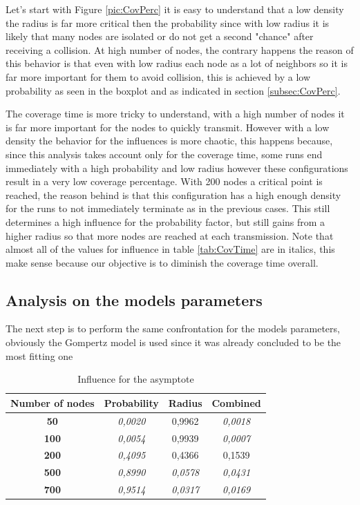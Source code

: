 Let's start with Figure \ref{pic:CovPerc} it is easy to understand that a low density the radius is far more critical then the probability since with low radius it is likely that many nodes are isolated or do not get a second "chance" after receiving a collision. At high number of nodes, the contrary happens the reason of this behavior is that even with low radius each node as a lot of neighbors so it is far more important for them to avoid collision, this is achieved by a low probability as seen in the boxplot and as indicated in section \ref{subsec:CovPerc}.

The coverage time is more tricky to understand, with a high number of nodes it is far more important for the nodes to quickly transmit. However with a low density the behavior for the influences is more chaotic, this happens because, since this analysis takes account only for the coverage time, some runs end immediately with a high probability and low radius however these configurations result in a very low coverage percentage. With 200 nodes a critical point is reached, the reason behind is that this configuration has a high enough density for the runs to not immediately terminate as in the previous cases. This still determines a high influence for the probability factor, but still gains from a higher radius so that more nodes are reached at each transmission. Note that almost all of the values for influence in table \ref{tab:CovTime} are in italics, this make sense because our objective is to diminish the coverage time overall.

\subsection{Analysis on the models parameters}
The next step is to perform the same confrontation for the models parameters, obviously the Gompertz model is used since it was already concluded to be the most fitting one

\begin{table}[H]
\centering
\begin{tabular}{|c|c|c|c|}
\hline
\textbf{Number of   nodes} & \textbf{Probability} & \textbf{Radius} & \textbf{Combined} \\ \hline
\textbf{50} & \textit{0,0020} & 0,9962 & \textit{0,0018} \\ \hline
\textbf{100} & \textit{0,0054} & 0,9939 & \textit{0,0007} \\ \hline
\textbf{200} & \textit{0,4095} & 0,4366 & 0,1539 \\ \hline
\textbf{500} & \textit{0,8990} & \textit{0,0578} & \textit{0,0431} \\ \hline
\textbf{700} & \textit{0,9514} & \textit{0,0317} & \textit{0,0169} \\ \hline
\end{tabular}
\caption{Influence for the asymptote}
\end{table}

